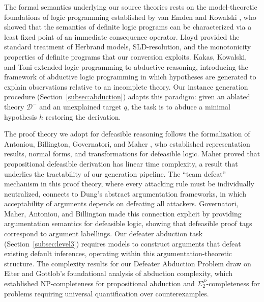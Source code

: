 \documentclass{article}
\theoremstyle{definition}
\newcommand{\Dm}{\mathcal{D}^{-}}
\begin{document}
The formal semantics underlying our source theories rests on the model-theoretic foundations of logic programming established by van Emden and Kowalski \cite{vanemden1976semantics}, who showed that the semantics of definite logic programs can be characterized via a least fixed point of an immediate consequence operator. Lloyd \cite{lloyd1987foundations} provided the standard treatment of Herbrand models, SLD-resolution, and the monotonicity properties of definite programs that our conversion exploits. Kakas, Kowalski, and Toni \cite{kakas1992abductive} extended logic programming to abductive reasoning, introducing the framework of abductive logic programming in which hypotheses are generated to explain observations relative to an incomplete theory. Our instance generation procedure (Section~\ref{subsec:abduction}) adapts this paradigm: given an ablated theory $\Dm$ and an unexplained target $q$, the task is to abduce a minimal hypothesis $h$ restoring the derivation.

The proof theory we adopt for defeasible reasoning follows the formalization of Antoniou, Billington, Governatori, and Maher \cite{antoniou2001defeasible}, who established representation results, normal forms, and transformations for defeasible logic. Maher \cite{maher2001propositional} proved that propositional defeasible derivation has linear time complexity, a result that underlies the tractability of our generation pipeline. The ``team defeat'' mechanism in this proof theory, where every attacking rule must be individually neutralized, connects to Dung's \cite{dung1995acceptability} abstract argumentation frameworks, in which acceptability of arguments depends on defeating all attackers. Governatori, Maher, Antoniou, and Billington \cite{governatori2004argumentation} made this connection explicit by providing argumentation semantics for defeasible logic, showing that defeasible proof tags correspond to argument labellings. Our defeater abduction task (Section~\ref{subsec:level3}) requires models to construct arguments that defeat existing default inferences, operating within this argumentation-theoretic structure. The complexity results for our Defeater Abduction Problem draw on Eiter and Gottlob's \cite{eiter1995complexity} foundational analysis of abduction complexity, which established NP-completeness for propositional abduction and $\Sigma_2^P$-completeness for problems requiring universal quantification over counterexamples.
\end{document}
